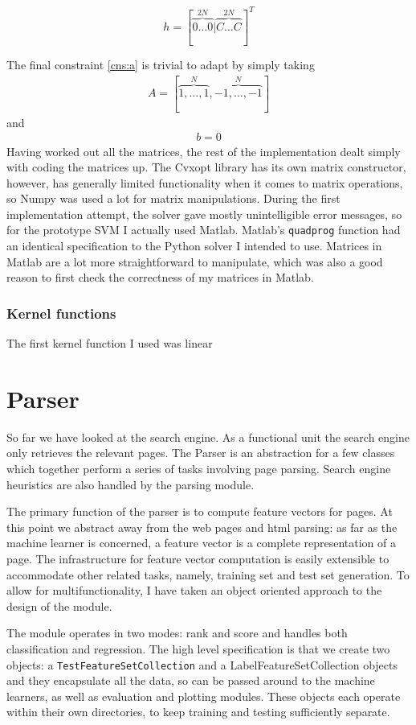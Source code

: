 \documentclass[12pt,twoside,notitlepage]{report}
\begin{document}
\[h = [\overbrace{0 \dots 0}^{2N}|\overbrace{C \dots C}^{2N}]^T\]

The final constraint \ref{cns:a} is trivial to adapt by simply taking 
\begin{gather*}
A=[\overbrace{1,\dots,1}^N,\overbrace{-1,\dots,-1}^N]
\end{gather*}
and
\begin{gather*}
b=0
\end{gather*}
Having worked out all the matrices, the rest of the implementation dealt simply
with coding the matrices up. The Cvxopt library has its own matrix constructor,
however, has generally limited functionality when it comes to matrix
operations, so Numpy was used a lot for matrix manipulations. During the first
implementation attempt, the solver gave mostly unintelligible error messages,
so for the prototype SVM I actually used Matlab. Matlab's \texttt{quadprog}
function had an identical specification to the Python solver I intended to use.
Matrices in Matlab are a lot more straightforward to manipulate, which was also
a good reason to first check the correctness of my matrices in Matlab.

\subsubsection*{Kernel functions}
The first kernel function I used was linear

\section{Parser}

So far we have looked at the search engine. As a functional unit the search
engine only retrieves the relevant pages. The Parser is an abstraction for a
few classes which together perform a series of tasks involving page parsing. 
Search engine heuristics are also handled by the parsing module.

The primary function of the parser is to compute feature vectors for pages.
At this point we abstract away from the web pages and html parsing:
as far as the machine learner is concerned, a feature vector is a complete
representation of a page.
The infrastructure for feature vector computation is easily extensible to
accommodate other related tasks, namely, training set and test set generation.
To allow for multifunctionality, I have taken an object oriented approach to the
design of the module.

The module operates in two modes: rank and score and handles both
classification and regression. The high level specification is that we create
two objects: a \texttt{TestFeatureSetCollection} and a LabelFeatureSetCollection
objects and they encapsulate all the data, so can be passed around to the
machine learners, as well as evaluation and plotting modules. These objects
each operate within their own directories, to keep training and testing
sufficiently separate. 
\end{document}

